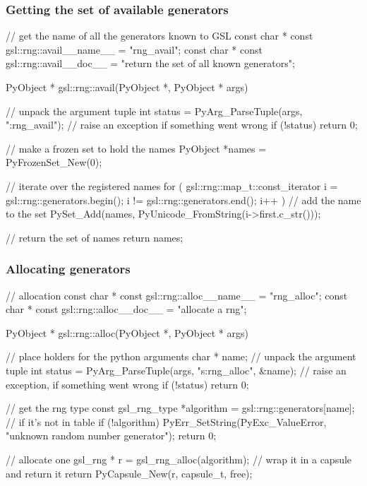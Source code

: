 \begin{frame}[fragile]
%
  \frametitle{Getting the set of available generators}
%
  \begin{iC++}{}
// get the name of all the generators known to GSL
const char * const gsl::rng::avail__name__ = "rng_avail";
const char * const gsl::rng::avail__doc__ =
     "return the set of all known generators";

PyObject * 
gsl::rng::avail(PyObject *, PyObject * args) {
    // unpack the argument tuple
    int status = PyArg_ParseTuple(args, ":rng_avail");
    // raise an exception if something went wrong
    if (!status) return 0;

    // make a frozen set to hold the names
    PyObject *names = PyFrozenSet_New(0);

    // iterate over the registered names
    for (
         gsl::rng::map_t::const_iterator i = gsl::rng::generators.begin();
         i != gsl::rng::generators.end();
         i++ ) {
        // add the name to the set
        PySet_Add(names, PyUnicode_FromString(i->first.c_str()));
    }

    // return the set of names
    return names;
}
  \end{iC++}
%
\end{frame}

\begin{frame}[fragile]
%
  \frametitle{Allocating generators}
%
  \begin{iC++}{}
// allocation
const char * const gsl::rng::alloc__name__ = "rng_alloc";
const char * const gsl::rng::alloc__doc__ = "allocate a rng";

PyObject * 
gsl::rng::alloc(PyObject *, PyObject * args) {
    // place holders for the python arguments
    char * name;
    // unpack the argument tuple
    int status = PyArg_ParseTuple(args, "s:rng_alloc", &name);
    // raise an exception, if something went wrong
    if (!status) return 0;

    // get the rng type
    const gsl_rng_type *algorithm = gsl::rng::generators[name];
    // if it's not in table
    if (!algorithm) {
        PyErr_SetString(PyExc_ValueError, "unknown random number generator");
        return 0;
    }

    // allocate one
    gsl_rng * r = gsl_rng_alloc(algorithm);
    // wrap it in a capsule and return it
    return PyCapsule_New(r, capsule_t, free);
}
  \end{iC++}
%
\end{frame}

